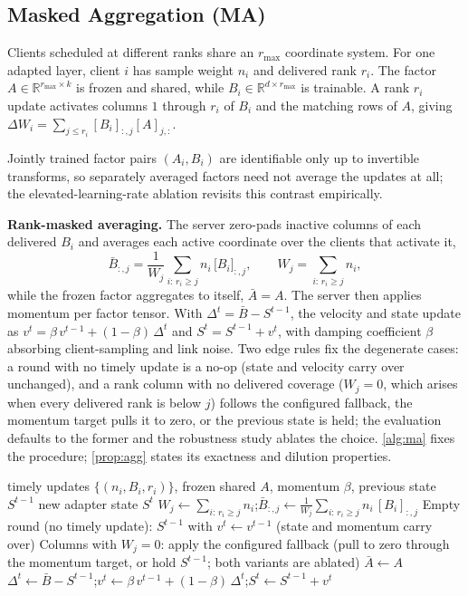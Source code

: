 \documentclass[a4paper,fleqn]{cas-dc}
\begin{document}
\subsection{Masked Aggregation (MA)}
\label{sec:aggregation}
Clients scheduled at different ranks share an $r_{\max}$ coordinate system. For one adapted layer, client $i$ has sample weight $n_i$ and delivered rank $r_i$. The factor $A\in\mathbb R^{r_{\max}\times k}$ is frozen and shared, while $B_i\in\mathbb R^{d\times r_{\max}}$ is trainable. A rank $r_i$ update activates columns $1$ through $r_i$ of $B_i$ and the matching rows of $A$, giving $\Delta W_i=\sum_{j\le r_i}[B_i]_{:,j}[A]_{j,:}$.
\par
Jointly trained factor pairs $(A_i,B_i)$ are identifiable only up to invertible transforms, so separately averaged factors need not average the updates at all; the elevated-learning-rate ablation revisits this contrast empirically.
\par
\textbf{Rank-masked averaging.} The server zero-pads inactive columns of each delivered $B_i$ and averages each active coordinate over the clients that activate it,
\begin{equation}
\bar B_{:,j}=\frac{1}{W_j}\sum_{i:\,r_i\ge j} n_i\,\big[B_i\big]_{:,j},
\qquad
W_j=\sum_{i:\,r_i\ge j} n_i ,
\label{eq:maskavg}
\end{equation}
while the frozen factor aggregates to itself, $\bar A=A$. The server then applies momentum per factor tensor. With $\Delta^t=\bar B-S^{t-1}$, the velocity and state update as $v^t=\beta\,v^{t-1}+(1-\beta)\,\Delta^t$ and $S^t=S^{t-1}+v^t$, with damping coefficient $\beta$ absorbing client-sampling and link noise. Two edge rules fix the degenerate cases: a round with no timely update is a no-op (state and velocity carry over unchanged), and a rank column with no delivered coverage ($W_j=0$, which arises when every delivered rank is below $j$) follows the configured fallback, the momentum target pulls it to zero, or the previous state is held; the evaluation defaults to the former and the robustness study ablates the choice. \cref{alg:ma} fixes the procedure; \cref{prop:agg} states its exactness and dilution properties.
\par
\begin{algorithm}[tbp]
\caption{Masked Aggregation (MA)}
\label{alg:ma}
\begin{algorithmic}[1]
\Require timely updates $\{(n_i,B_i,r_i)\}$, frozen shared $A$, momentum $\beta$, previous state $S^{t-1}$
\Ensure new adapter state $S^t$
\State $W_j\gets\sum_{i:\,r_i\ge j} n_i$;\quad $\bar B_{:,j}\gets\frac{1}{W_j}\sum_{i:\,r_i\ge j} n_i\,[B_i]_{:,j}$
\EndFor
\State Empty round (no timely update): \Return $S^{t-1}$ with $v^t\gets v^{t-1}$ (state and momentum carry over)
\State Columns with $W_j=0$: apply the configured fallback (pull to zero through the momentum target, or hold $S^{t-1}$; both variants are ablated)
\State $\bar A\gets A$
\State $\Delta^t\gets\bar B-S^{t-1}$;\quad $v^t\gets\beta\,v^{t-1}+(1-\beta)\,\Delta^t$;\quad $S^t\gets S^{t-1}+v^t$
\end{algorithmic}
\end{algorithm}
\par
\end{document}

